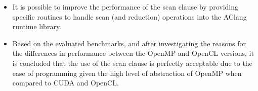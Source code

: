 \documentclass[Ingles]{ic-tese-v1}
\begin{document}
\begin{itemize}
	\item It is possible to improve  the performance of the scan clause by
	providing specific routines to handle scan (and reduction) operations
	into the AClang  runtime  library.
	\item Based on the evaluated benchmarks, and after investigating the
	reasons for the differences in performance between the OpenMP and
	OpenCL versions, it is concluded that the use of the scan clause is
	perfectly acceptable due to the ease of programming given the high
	level of abstraction of OpenMP when compared to CUDA and OpenCL.
\end{itemize}






\end{document}
